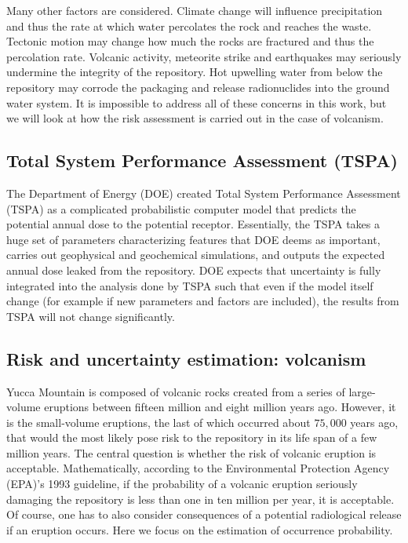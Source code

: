 \documentclass[nofootinbib,preprint,aps]{revtex4-1}
\begin{document}
        Many other factors are considered. Climate change will influence precipitation and thus the
        rate at which water percolates the rock and reaches the waste. 
        Tectonic motion may change how much the rocks are fractured and thus the percolation rate.
        Volcanic activity, meteorite strike and earthquakes may seriously undermine the integrity of the repository.
        Hot upwelling water from below the repository may corrode the packaging and release radionuclides into
        the ground water system. It is impossible to address all of these concerns in this work, but we will look
        at how the risk assessment is carried out in the case of volcanism.

        \subsection{Total System Performance Assessment (TSPA)}
        The Department of Energy (DOE) created Total System Performance Assessment (TSPA) as a complicated
        probabilistic
        computer model that predicts the potential annual dose to the potential receptor.
        Essentially, the TSPA takes a huge set of parameters characterizing features that DOE deems as important,
        carries out geophysical and geochemical simulations,
        and outputs the expected annual dose leaked from the repository.
        DOE expects that
        uncertainty is fully integrated into the analysis done by TSPA such that even if the model itself change
        (for example if new parameters and factors are included), the results from TSPA will not change
        significantly.\cite{cv14,ocrwm02} 

        \subsection{Risk and uncertainty estimation: volcanism}
        \label{sec:volcano}
        Yucca Mountain is composed of volcanic rocks created from a series of large-volume eruptions between
        fifteen million and eight million years ago. However, it is the small-volume eruptions, the last of
        which occurred about $75,000$ years ago, that would the most likely pose risk to the repository
        in its life span of a few million years.
        The central question is whether the risk of volcanic eruption is acceptable. Mathematically,
        according to the Environmental Protection Agency (EPA)'s 1993 guideline,
        if the probability of a volcanic eruption seriously damaging the repository is less than
        one in ten million per year, it is acceptable.\cite{epa93}
        Of course, one has to also consider consequences of a potential radiological release if an eruption
        occurs. Here we focus on the estimation of occurrence probability.
\end{document}

